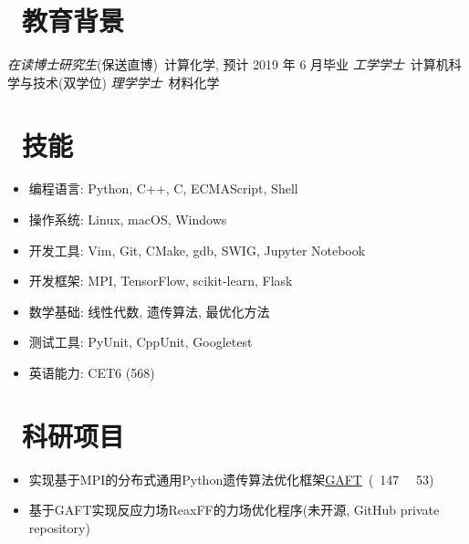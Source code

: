 \documentclass{resume}
\begin{document}


 
\section{\faGraduationCap\  教育背景}
\textit{在读博士研究生}(保送直博)\ 计算化学, 预计 2019 年 6 月毕业
\textit{工学学士}\ 计算机科学与技术(双学位)
\textit{理学学士}\ 材料化学

\section{\faCogs\ 技能}
\begin{itemize}[parsep=0.5ex]
  \item 编程语言: Python, C++, C, ECMAScript, Shell
  \item 操作系统: Linux, macOS, Windows
  \item 开发工具: Vim, Git, CMake, gdb, SWIG, Jupyter Notebook
  \item 开发框架: MPI, TensorFlow, scikit-learn, Flask
  \item 数学基础: 线性代数, 遗传算法, 最优化方法
  \item 测试工具: PyUnit, CppUnit, Googletest
  \item 英语能力: CET6 (568)
\end{itemize}

\section{\faUsers\ 科研项目}

\begin{onehalfspacing}
\begin{itemize}
    \item 实现基于MPI的分布式通用Python遗传算法优化框架\faLink \href{https://github.com/PytLab/gaft}{GAFT}\ (\faStar\ 147 \ \faCodeFork\ 53)
    \item 基于GAFT实现反应力场ReaxFF的力场优化程序(未开源, GitHub private repository)
\end{itemize}
\end{onehalfspacing}
\end{document}
